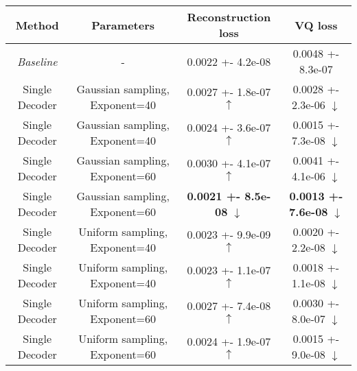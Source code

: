 \centering
\scriptsize
\begin{tabular}{||c|c|c|c||}
\hline
 Method & Parameters & Reconstruction loss & VQ loss \\
\hline
\textit{Baseline} & - & 0.0022 +- 4.2e-08 & 0.0048 +- 8.3e-07 \\
\hline
Single Decoder & Gaussian sampling, Exponent=40 & 0.0027 +- 1.8e-07  $\uparrow$ & 0.0028 +- 2.3e-06  $\downarrow$ \\
\hline
Single Decoder & Gaussian sampling, Exponent=40 & 0.0024 +- 3.6e-07  $\uparrow$ & 0.0015 +- 7.3e-08  $\downarrow$ \\
\hline
Single Decoder & Gaussian sampling, Exponent=60 & 0.0030 +- 4.1e-07  $\uparrow$ & 0.0041 +- 4.1e-06  $\downarrow$ \\
\hline
Single Decoder & Gaussian sampling, Exponent=60 & \textbf{0.0021 +- 8.5e-08}  $\downarrow$ & \textbf{0.0013 +- 7.6e-08}  $\downarrow$ \\
\hline
Single Decoder & Uniform sampling, Exponent=40 & 0.0023 +- 9.9e-09  $\uparrow$ & 0.0020 +- 2.2e-08  $\downarrow$ \\
\hline
Single Decoder & Uniform sampling, Exponent=40 & 0.0023 +- 1.1e-07  $\uparrow$ & 0.0018 +- 1.1e-08  $\downarrow$ \\
\hline
Single Decoder & Uniform sampling, Exponent=60 & 0.0027 +- 7.4e-08  $\uparrow$ & 0.0030 +- 8.0e-07  $\downarrow$ \\
\hline
Single Decoder & Uniform sampling, Exponent=60 & 0.0024 +- 1.9e-07  $\uparrow$ & 0.0015 +- 9.0e-08  $\downarrow$ \\
\hline
\end{tabular}
